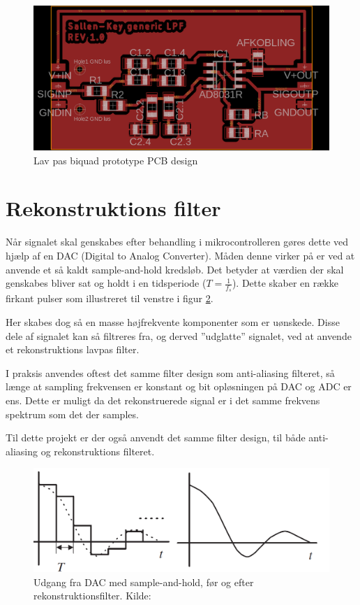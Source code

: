 \begin{figure}[H]
	\centering
	\includegraphics[width=.7\linewidth]{billeder/skbiquadpcb}
	\caption{Lav pas biquad prototype PCB design}
	\label{fig:skbiquadpcb}
\end{figure}

\section{Rekonstruktions filter}

Når signalet skal genskabes efter behandling i mikrocontrolleren gøres dette ved hjælp af en DAC (Digital to Analog Converter). 
Måden denne virker på er ved at anvende et så kaldt sample-and-hold kredsløb.
Det betyder at værdien der skal genskabes bliver sat og holdt i en
tidsperiode ($T=\frac{1}{f_s}$). Dette skaber en række firkant pulser som
illustreret til venstre i figur \ref{fig:samplholdrecon}.

Her skabes dog så en masse højfrekvente komponenter som er uønskede.
Disse dele af signalet kan så filtreres fra, og derved ''udglatte'' signalet, ved at anvende et rekonstruktions lavpas filter.

I praksis anvendes oftest det samme filter design som anti-aliasing filteret,
så længe at sampling frekvensen er konstant og bit opløsningen på DAC og ADC
er ens. Dette er muligt da det rekonstruerede signal er i det samme frekvens
spektrum som det der samples.

Til dette projekt er der også anvendt det samme filter design, til både anti-aliasing og rekonstruktions filteret.

\begin{figure}[H]
	\centering
	\includegraphics[width=0.6\linewidth]{billeder/dacrecon}
	\caption{Udgang fra DAC med sample-and-hold, før og efter rekonstruktionsfilter. Kilde:\cite{Tan2013}}
	\label{fig:samplholdrecon}
\end{figure}
